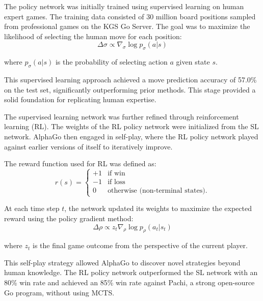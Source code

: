 The policy network was initially trained using supervised learning on human
expert games. The training data consisted of 30 million board positions sampled
from professional games on the KGS Go Server. The goal was to maximize the
likelihood of selecting the human move for each position:
\begin{equation}
    \Delta \sigma \propto \nabla_\sigma \log p_\sigma(a | s)
\end{equation}

where \( p_\sigma(a | s) \) is the probability of selecting action \( a \)
given state \( s \).

This supervised learning approach achieved a move prediction accuracy of 57.0\%
on the test set, significantly outperforming prior methods. This stage provided
a solid foundation for replicating human expertise.

The supervised learning network was further refined through reinforcement
learning (RL). The weights of the RL policy network were initialized from the
SL network. AlphaGo then engaged in self-play, where the RL policy network
played against earlier versions of itself to iteratively improve.

The reward function used for RL was defined as:
\begin{equation}
    r(s) =
    \begin{cases}
        +1 & \text{if win}                           \\
        -1 & \text{if loss}                          \\
        0  & \text{otherwise (non-terminal states).}
    \end{cases}
\end{equation}

At each time step \( t \), the network updated its weights to maximize the
expected reward using the policy gradient method:
\begin{equation}
    \Delta \rho \propto z_t \nabla_\rho \log p_\rho(a_t | s_t)
\end{equation}

where \( z_t \) is the final game outcome from the perspective of the current
player.

This self-play strategy allowed AlphaGo to discover novel strategies beyond
human knowledge. The RL policy network outperformed the SL network with an 80\%
win rate and achieved an 85\% win rate against Pachi, a strong open-source Go
program, without using MCTS.

